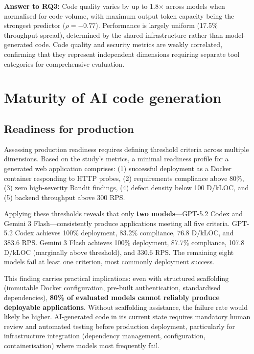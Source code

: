 \textbf{Answer to RQ3:} Code quality varies by up to 1.8$\times$ across models when normalised for code volume, with maximum output token capacity being the strongest predictor ($\rho = -0.77$). Performance is largely uniform (17.5\% throughput spread), determined by the shared infrastructure rather than model-generated code. Code quality and security metrics are weakly correlated, confirming that they represent independent dimensions requiring separate tool categories for comprehensive evaluation.

\section{Maturity of AI code generation}

\subsection{Readiness for production}

Assessing production readiness requires defining threshold criteria across multiple dimensions. Based on the study's metrics, a minimal readiness profile for a generated web application comprises: (1) successful deployment as a Docker container responding to HTTP probes, (2) requirements compliance above 80\%, (3) zero high-severity Bandit findings, (4) defect density below 100 D/kLOC, and (5) backend throughput above 300 RPS.

Applying these thresholds reveals that only \textbf{two models}---GPT-5.2 Codex and Gemini 3 Flash---consistently produce applications meeting all five criteria. GPT-5.2 Codex achieves 100\% deployment, 83.2\% compliance, 76.8 D/kLOC, and 383.6 RPS. Gemini 3 Flash achieves 100\% deployment, 87.7\% compliance, 107.8 D/kLOC (marginally above threshold), and 330.6 RPS. The remaining eight models fail at least one criterion, most commonly deployment success.

This finding carries practical implications: even with structured scaffolding (immutable Docker configuration, pre-built authentication, standardised dependencies), \textbf{80\% of evaluated models cannot reliably produce deployable applications}. Without scaffolding assistance, the failure rate would likely be higher. AI-generated code in its current state requires mandatory human review and automated testing before production deployment, particularly for infrastructure integration (dependency management, configuration, containerisation) where models most frequently fail.

